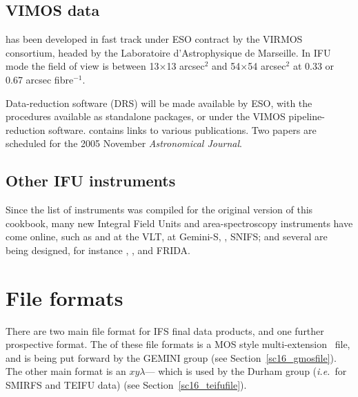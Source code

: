 \documentclass[twoside,11pt]{starlink}
\providecommand{\FITSref}{\htmladdnormallink{FITS}{http://fits.gsfc.nasa.gov/}}
\begin{document}
\subsection{VIMOS data\label{sc16_vimos}}

 has
been developed in fast track under ESO contract by the VIRMOS
consortium, headed by the Laboratoire d'Astrophysique de Marseille. In
IFU mode the field of view is between 13$\times$13 arcsec$^2$ and
54$\times$54 arcsec$^2$ at 0.33 or 0.67 arcsec fibre$^{-1}$.

Data-reduction software (DRS) will be made available by ESO, with the
procedures available as standalone packages, or under the VIMOS
pipeline-reduction software.\goodbreak
{}
contains links to various publications.  Two papers are scheduled for
the 2005 November \emph{Astronomical Journal}.

\subsection{Other IFU instruments\label{sc16_other}}

Since the list of instruments was compiled for the original version of
this cookbook, many new Integral Field Units and area-spectroscopy
instruments have come online, such as
and 
at the VLT,
at Gemini-S,
,
SNIFS; and several are being designed, for instance
,
,
and FRIDA.

\newpage
\section{File formats\label{sc16_fileformat}}

There are two main file format for IFS final data products, and one
further prospective format.  The  of
these file formats is a MOS style multi-extension
\FITSref\ file, and is
being put forward by the GEMINI group (see
Section~\ref{sc16_gmosfile}).  The other main format is an
$xy\lambda$--- which is used by the
Durham group (\emph{i.e.}\ for SMIRFS and TEIFU data) (see
Section~\ref{sc16_teifufile}).
\end{document}
